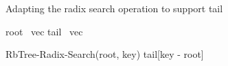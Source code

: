 \begin{listing}[ht!]
    \caption{Adapting the radix search operation to support tail}
    \label{lst:pvec-radix-search}
    
    \begin{algorithmic}
        
        \State root \la\ vec
        \State tail \la\ vec

            \State \Return RbTree-Radix-Search(root, key)            
        \Else            
            \State \Return tail[key - root]            
        \EndIf
        \EndFunction
    \end{algorithmic}
\end{listing}